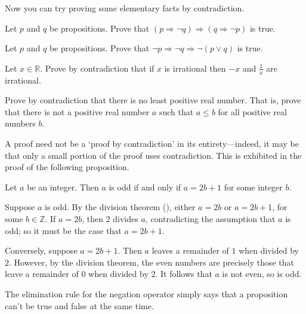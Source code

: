 Now you can try proving some elementary facts by contradiction.

\begin{exercise}
Let $p$ and $q$ be propositions. Prove that $(p \Rightarrow \neg q) \Rightarrow (q \Rightarrow \neg p)$ is true.

\end{exercise}

\begin{exercise}
Let $p$ and $q$ be propositions. Prove that $\neg p \Rightarrow \neg q \Rightarrow \neg(p \vee q)$ is true.

\end{exercise}

\begin{exercise}
\label{exNegationAndReciprocalOfIrrationalNumbers}
Let $x \in \mathbb{R}$. Prove by contradiction that if $x$ is irrational then $-x$ and $\frac{1}{x}$ are irrational.
\end{exercise}

\begin{exercise}
\label{exNoLeastPositiveReal}
Prove by contradiction that there is no least positive real number. That is, prove that there is not a positive real number $a$ such that $a \le b$ for all positive real numbers $b$.
\end{exercise}

A proof need not be a `proof by contradiction' in its entirety---indeed, it may be that only a small portion of the proof uses contradiction. This is exhibited in the proof of the following proposition.

\begin{proposition}
\label{propOddIffRemainderOfOne}
Let $a$ be an integer. Then $a$ is odd if and only if $a=2b+1$ for some integer $b$.
\end{proposition}
\begin{cproof}
Suppose $a$ is odd. By the division theorem (), either $a=2b$ or $a=2b+1$, for some $b \in \mathbb{Z}$. If $a=2b$, then $2$ divides $a$, contradicting the assumption that $a$ is odd; so it must be the case that $a=2b+1$.

Conversely, suppose $a=2b+1$. Then $a$ leaves a remainder of $1$ when divided by $2$. However, by the division theorem, the even numbers are precisely those that leave a remainder of $0$ when divided by $2$. It follows that $a$ is not even, so is odd.
\end{cproof}

The elimination rule for the negation operator \elimrule{\neg} simply says that a proposition can't be true and false at the same time.

